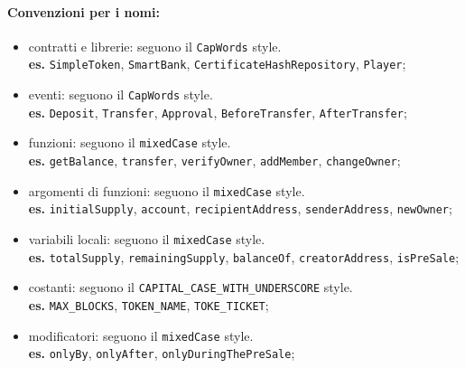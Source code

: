 \documentclass[../ProcessiPrimari.tex]{subfiles}
\begin{document}
\paragraph*{Convenzioni per i nomi: }
\begin{itemize}
	\item contratti e librerie: seguono il \texttt{CapWords} style.\\
	\textbf{es.} \texttt{SimpleToken}, \texttt{SmartBank}, \texttt{CertificateHashRepository}, \texttt{Player};
	\item eventi: seguono il \texttt{CapWords} style.\\
	\textbf{es.} \texttt{Deposit}, \texttt{Transfer}, \texttt{Approval}, \texttt{BeforeTransfer}, \texttt{AfterTransfer};
	\item funzioni: seguono il \texttt{mixedCase} style.\\
	\textbf{es.} \texttt{getBalance}, \texttt{transfer}, \texttt{verifyOwner}, \texttt{addMember}, \texttt{changeOwner};
	\item argomenti di funzioni: seguono il \texttt{mixedCase} style.\\
	\textbf{es.} \texttt{initialSupply}, \texttt{account}, \texttt{recipientAddress}, \texttt{senderAddress}, \texttt{newOwner};
	\item variabili locali: seguono il \texttt{mixedCase} style.\\
	\textbf{es.} \texttt{totalSupply}, \texttt{remainingSupply}, \texttt{balanceOf}, \texttt{creatorAddress}, \texttt{isPreSale};
	\item costanti: seguono il \texttt{CAPITAL\_CASE\_WITH\_UNDERSCORE} style.\\
	\textbf{es.} \texttt{MAX\_BLOCKS}, \texttt{TOKEN\_NAME}, \texttt{TOKE\_TICKET};
	\item modificatori: seguono il \texttt{mixedCase} style.\\
	\textbf{es.} \texttt{onlyBy}, \texttt{onlyAfter}, \texttt{onlyDuringThePreSale};
\end{itemize}
\end{document}
